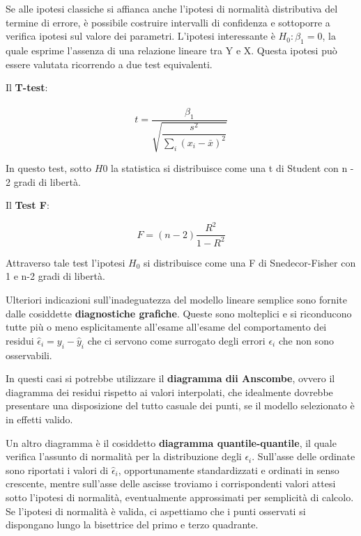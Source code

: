 \documentclass[a4paper]{extarticle}
\begin{document}
Se alle ipotesi classiche si affianca anche l'ipotesi di normalità distributiva del termine di errore, è possibile costruire intervalli di confidenza e sottoporre a verifica ipotesi sul valore dei parametri. L'ipotesi interessante è $H_0: \beta_1 = 0$, la quale esprime l'assenza di una relazione lineare tra Y e X. Questa ipotesi può essere valutata ricorrendo a due test equivalenti.

Il \textbf{T-test}:

\begin{equation*}
t = \dfrac{\hat \beta_1}{\sqrt{\dfrac{s^2}{\sum\limits_i(x_i - \bar x)^2}}}
\end{equation*}

In questo test, sotto $H0$ la statistica si distribuisce come una t di Student con n - 2 gradi di libertà.

Il \textbf{Test F}:

\begin{equation*}
F = (n-2) \dfrac{R^2}{1-R^2}
\end{equation*}

Attraverso tale test l'ipotesi $H_0$ si distribuisce come una F di Snedecor-Fisher con 1 e n-2 gradi di libertà.

Ulteriori indicazioni sull'inadeguatezza del modello lineare semplice sono fornite dalle cosiddette \textbf{diagnostiche grafiche}. Queste sono molteplici e si riconducono tutte più o meno esplicitamente all'esame all'esame del comportamento dei residui $\hat \epsilon_i = y_i -\hat y_i$  che ci servono come surrogato degli errori $\epsilon_i$ che non sono osservabili.

In questi casi si potrebbe utilizzare il \textbf{diagramma dii Anscombe}, ovvero il diagramma dei residui rispetto ai valori interpolati, che idealmente dovrebbe presentare una disposizione del tutto casuale dei punti, se il modello selezionato è in effetti valido.

Un altro diagramma è il cosiddetto \textbf{diagramma quantile-quantile}, il quale verifica l'assunto di normalità per la distribuzione degli $\epsilon_i$.  Sull'asse delle ordinate sono riportati i valori di $\hat \epsilon_i$, opportunamente standardizzati e ordinati in senso crescente, mentre sull'asse delle ascisse troviamo i corrispondenti valori attesi sotto l'ipotesi di normalità, eventualmente approssimati per semplicità di calcolo. Se l'ipotesi di normalità è valida, ci aspettiamo che i punti osservati si dispongano lungo la bisettrice del primo e terzo quadrante.
\end{document}
